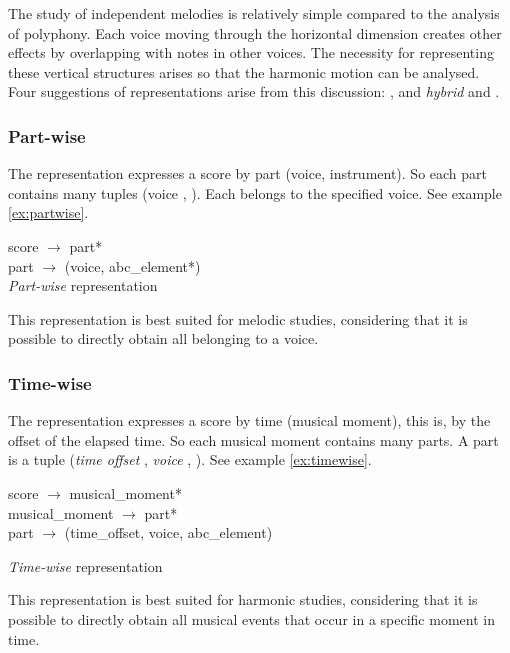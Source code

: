 The study of independent melodies is relatively simple compared to the analysis of polyphony. Each
voice moving through the horizontal dimension creates other effects by overlapping with notes in
other voices. The necessity for representing these vertical structures arises so that the harmonic
motion can be analysed.\\

Four suggestions of representations arise from this discussion: \partwise{}, \timewise{} and
\emph{hybrid} and \sourcewise{}.

\subsubsection{Part-wise}

The \partwise{} representation expresses a score by part (voice, instrument). So each part contains
many tuples (voice , \abcelements{}). Each \abcelement{} belongs to the specified voice. See example
\ref{ex:partwise}.

\begin{program}
  score $\rightarrow$ part*\\
  part $\rightarrow$ (voice, abc\_element*)\\
  \caption{\emph{Part-wise} representation}
  \label{ex:partwise}
\end{program}

This representation is best suited for melodic studies, considering that it is possible to directly
obtain all \abcelements{} belonging to a voice.

\subsubsection{Time-wise}

The \timewise{} representation expresses a score by time (musical moment), this is, by the offset of
the elapsed time. So each musical moment contains many parts. A part is a tuple (\emph{time offset}
, \emph{voice} , \abcelement{}). See example \ref{ex:timewise}.

\begin{program}
  score $\rightarrow$ musical\_moment*\\
  musical\_moment $\rightarrow$ part*\\
  part $\rightarrow$ (time\_offset, voice, abc\_element)
  \caption{\emph{Time-wise} representation}
  \label{ex:timewise}
\end{program}

This representation is best suited for harmonic studies, considering that it is possible to directly
obtain all musical events that occur in a specific moment in time.

